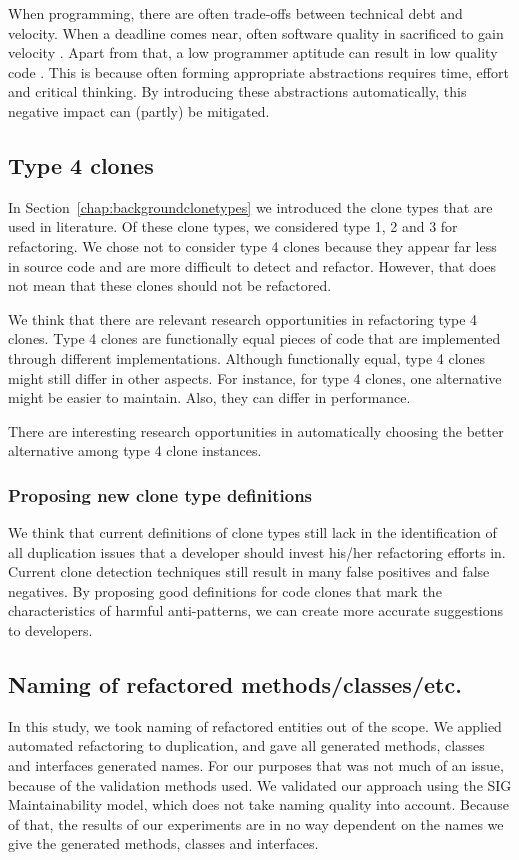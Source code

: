 When programming, there are often trade-offs between technical debt and velocity. When a deadline comes near, often software quality in sacrificed to gain velocity \cite{costello1984software, austin2001effects, shah2014global}. Apart from that, a low programmer aptitude can result in low quality code \cite{cheney1984effects}. This is because often forming appropriate abstractions requires time, effort and critical thinking. By introducing these abstractions automatically, this negative impact can (partly) be mitigated.

\subsection{Type 4 clones}
In Section~\ref{chap:backgroundclonetypes} we introduced the clone types that are used in literature. Of these clone types, we considered type 1, 2 and 3 for refactoring. We chose not to consider type 4 clones because they appear far less in source code and are more difficult to detect and refactor. However, that does not mean that these clones should not be refactored.

We think that there are relevant research opportunities in refactoring type 4 clones. Type 4 clones are functionally equal pieces of code that are implemented through different implementations. Although functionally equal, type 4 clones might still differ in other aspects. For instance, for type 4 clones, one alternative might be easier to maintain. Also, they can differ in performance.

There are interesting research opportunities in automatically choosing the better alternative among type 4 clone instances.

\subsubsection{Proposing new clone type definitions}
We think that current definitions of clone types still lack in the identification of all duplication issues that a developer should invest his/her refactoring efforts in. Current clone detection techniques still result in many false positives and false negatives. By proposing good definitions for code clones that mark the characteristics of harmful anti-patterns, we can create more accurate suggestions to developers.

\subsection{Naming of refactored methods/classes/etc.}
In this study, we took naming of refactored entities out of the scope. We applied automated refactoring to duplication, and gave all generated methods, classes and interfaces generated names. For our purposes that was not much of an issue, because of the validation methods used. We validated our approach using the SIG Maintainability model, which does not take naming quality into account. Because of that, the results of our experiments are in no way dependent on the names we give the generated methods, classes and interfaces.

